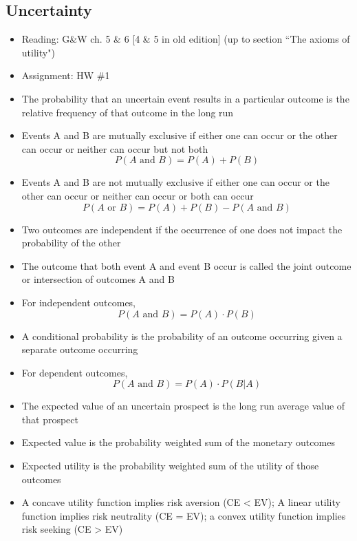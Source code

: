 \documentclass[12pt]{article}
\begin{document}
\subsection{Uncertainty}
\begin{itemize}
\item Reading: G\&W ch. 5 \& 6 [4 \& 5 in old edition] (up to section ``The axioms of utility")
\item Assignment: HW \#1
\item The probability that an uncertain event results in a particular outcome is the relative frequency of that outcome in the long run 
\item Events A and B are mutually exclusive if either one can occur or the other can occur or neither can occur but not both $$ P(A \text{ and } B) = P(A) + P(B) $$ 
\item Events A and B are not mutually exclusive if either one can occur or the other can occur or neither can occur or both can occur $$ P(A \text{ or } B) = P(A) + P(B) - P(A \text{ and } B) $$ 
\item Two outcomes are independent if the occurrence of one does not impact the probability of the other 
\item The outcome that both event A and event B occur is called the joint outcome or intersection of outcomes A and B 
\item For independent outcomes, $$ P(A \text{ and } B) = P(A) \cdot P(B) $$ 
\item A conditional probability is the probability of an outcome occurring given a separate outcome occurring 
\item For dependent outcomes, $$ P(A \text{ and } B) = P(A) \cdot P(B | A) $$ 
\item The expected value of an uncertain prospect is the long run average value of that prospect 
\item Expected value is the probability weighted sum of the monetary outcomes 
\item Expected utility is the probability weighted sum of the utility of those outcomes
\item A concave utility function implies risk aversion (CE < EV); A linear utility function implies risk neutrality (CE = EV); a convex utility function implies risk seeking (CE > EV)

\end{itemize}
\end{document}
